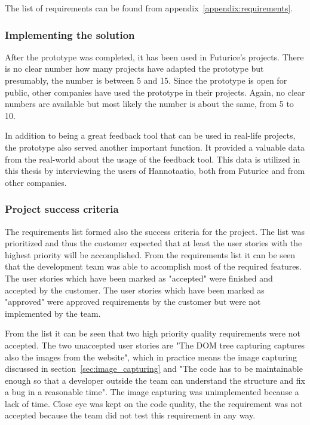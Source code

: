 \documentclass[english,12pt,a4paper,pdftex]{article}
\begin{document}
The list of requirements can be found from appendix~\ref{appendix:requirements}.

\subsubsection{Implementing the solution}

After the prototype was completed, it has been used in Futurice's projects. There is no clear number how many projects have adapted the prototype but presumably, the number is between 5 and 15. Since the prototype is open for public, other companies have used the prototype in their projects. Again, no clear numbers are available but most likely the number is about the same, from 5 to 10.

In addition to being a great feedback tool that can be used in real-life projects, the prototype also served another important function. It provided a valuable data from the real-world about the usage of the feedback tool. This data is utilized in this thesis by interviewing the users of Hannotaatio, both from Futurice and from other companies.

\subsubsection{Project success criteria}

The requirements list formed also the success criteria for the project. The list was prioritized and thus the customer expected that at least the user stories with the highest priority will be accomplished. From the requirements list it can be seen that the development team was able to accomplish most of the required features. The user stories which have been marked as "accepted" were finished and accepted by the customer. The user stories which have been marked as "approved" were approved requirements by the customer but were not implemented by the team.

From the list it can be seen that two high priority quality requirements were not accepted. The two unaccepted user stories are "The DOM tree capturing captures also the images from the website", which in practice means the image capturing discussed in section~\ref{sec:image_capturing} and "The code has to be maintainable enough so that a developer outside the team can understand the structure and fix a bug in a reasonable time". The image capturing was unimplemented because a lack of time. Close eye was kept on the code quality, the the requirement was not accepted because the team did not test this requirement in any way.
\end{document}
